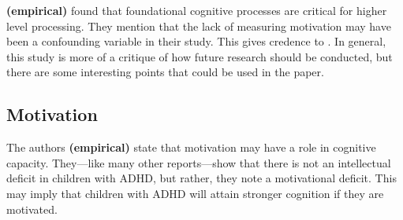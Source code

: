 \documentclass[stu]{apa7}
\begin{document}
\textcite{mohamed_basic_2021} \textbf{(empirical)} found that foundational cognitive processes are critical for higher level processing. They mention that the lack of measuring motivation may have been a confounding variable in their study. This gives credence to \textcite{skalski_impact_2021}. In general, this study is more of a critique of how future research should be conducted, but there are some interesting points that could be used in the paper.


\subsection{Motivation}
The authors \textcite{skalski_impact_2021} \textbf{(empirical)} state that motivation may have a role in cognitive capacity. They---like many other reports---show that there is not an intellectual deficit in children with ADHD, but rather, they note a motivational deficit. This may imply that children with ADHD will attain stronger cognition if they are motivated.




\printbibliography
\end{document}
